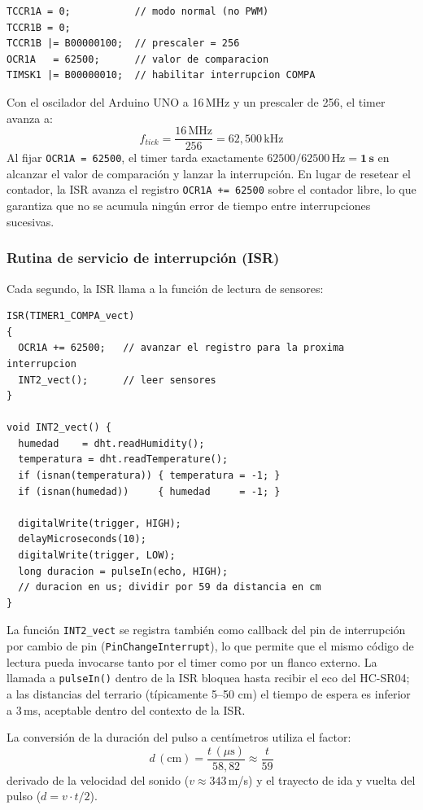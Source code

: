\documentclass[12pt, a4paper]{article}
\begin{document}
\begin{lstlisting}[style=arduino, caption={Configuración del Timer1 en setup()}]
TCCR1A = 0;           // modo normal (no PWM)
TCCR1B = 0;
TCCR1B |= B00000100;  // prescaler = 256
OCR1A   = 62500;      // valor de comparacion
TIMSK1 |= B00000010;  // habilitar interrupcion COMPA
\end{lstlisting}

\begin{notatecnica}
Con el oscilador del Arduino UNO a 16\,MHz y un prescaler de 256, el timer avanza a:
\[
f_{tick} = \frac{16\,\text{MHz}}{256} = 62{,}500\,\text{kHz}
\]
Al fijar \texttt{OCR1A = 62500}, el timer tarda exactamente
$62500 / 62500\,\text{Hz} = \mathbf{1\,\text{s}}$ en alcanzar el valor de comparación
y lanzar la interrupción. En lugar de resetear el contador, la ISR avanza el registro
\texttt{OCR1A += 62500} sobre el contador libre, lo que garantiza que no se acumula
ningún error de tiempo entre interrupciones sucesivas.
\end{notatecnica}

\subsubsection{Rutina de servicio de interrupción (ISR)}

Cada segundo, la ISR llama a la función de lectura de sensores:

\begin{lstlisting}[style=arduino, caption={ISR del Timer1 y función de lectura}]
ISR(TIMER1_COMPA_vect)
{
  OCR1A += 62500;   // avanzar el registro para la proxima interrupcion
  INT2_vect();      // leer sensores
}

void INT2_vect() {
  humedad    = dht.readHumidity();
  temperatura = dht.readTemperature();
  if (isnan(temperatura)) { temperatura = -1; }
  if (isnan(humedad))     { humedad     = -1; }

  digitalWrite(trigger, HIGH);
  delayMicroseconds(10);
  digitalWrite(trigger, LOW);
  long duracion = pulseIn(echo, HIGH);
  // duracion en us; dividir por 59 da distancia en cm
}
\end{lstlisting}

\begin{notatecnica}
La función \texttt{INT2\_vect} se registra también como callback del pin de
interrupción por cambio de pin (\texttt{PinChangeInterrupt}), lo que permite que
el mismo código de lectura pueda invocarse tanto por el timer como por un flanco
externo. La llamada a \texttt{pulseIn()} dentro de la ISR bloquea hasta recibir
el eco del HC-SR04; a las distancias del terrario (típicamente 5--50 cm) el
tiempo de espera es inferior a 3\,ms, aceptable dentro del contexto de la ISR.

La conversión de la duración del pulso a centímetros utiliza el factor:
\[
d\,(\text{cm}) = \frac{t\,(\mu\text{s})}{58{,}82} \approx \frac{t}{59}
\]
derivado de la velocidad del sonido ($v \approx 343$\,m/s) y el trayecto de ida
y vuelta del pulso ($d = v \cdot t / 2$).
\end{notatecnica}
\end{document}
